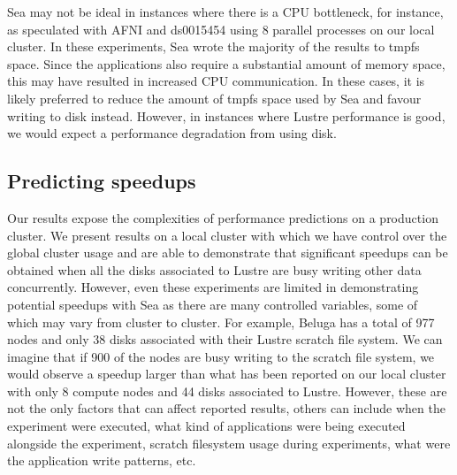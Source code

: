     Sea may not be ideal in instances where there is a CPU bottleneck, for instance, as speculated
    with AFNI and ds0015454 using 8 parallel processes on our local cluster. In these experiments, Sea wrote the majority of the results to tmpfs space.
    Since the applications also require a substantial amount of memory space,
    this may have resulted in increased CPU communication. In these cases, it
    is likely preferred to reduce the amount of tmpfs space used by Sea and
    favour writing to disk instead. However, in instances where Lustre
    performance is good, we would expect a performance degradation from
    using disk.


    \subsection{Predicting speedups}

    Our results expose the complexities of performance predictions on a
    production cluster. We present results on a local cluster with which we have
    control over the global cluster usage and are able to demonstrate that
    significant speedups can be obtained when all the disks associated to Lustre
    are busy writing other data concurrently. However, even these experiments
    are limited in demonstrating potential speedups with Sea as there are many
    controlled variables, some of which may vary from cluster to cluster. For
    example, Beluga has a total of 977 nodes and only 38 disks associated with
    their Lustre scratch file system. We can imagine that if 900 of the nodes
    are busy writing to the scratch file system, we would observe a speedup
    larger than what has been reported on our local cluster with only 8 compute
    nodes and 44 disks associated to Lustre. However, these are not the only
    factors that can affect reported results, others can include when the
    experiment were executed, what kind of applications were being executed
    alongside the experiment, scratch filesystem usage during experiments, what
    were the application write patterns, etc.

